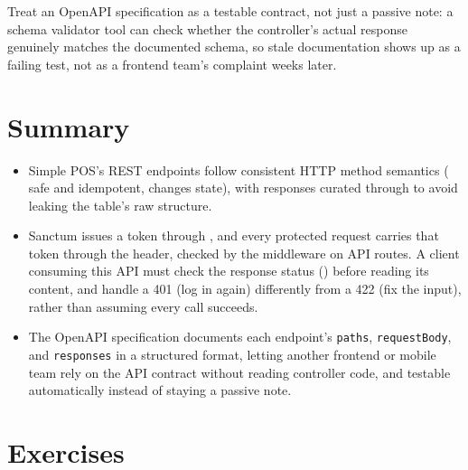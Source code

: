 \begin{tipbox}
Treat an OpenAPI specification as a testable contract, not just a
passive note: a schema validator tool can check whether the
controller's actual response genuinely matches the documented schema,
so stale documentation shows up as a failing test, not as a frontend
team's complaint weeks later.
\end{tipbox}


\section{Summary}
\label{sec:membangun-rest-api-rangkuman}

\begin{itemize}
  \item Simple POS's REST endpoints follow consistent HTTP method
    semantics ( safe and idempotent,  changes
    state), with responses curated through  to
    avoid leaking the table's raw structure.
  \item Sanctum issues a token through , and
    every protected request carries that token through the
     header, checked by the
     middleware on API routes. A client consuming
    this API must check the response status ()
    before reading its content, and handle a 401 (log in again)
    differently from a 422 (fix the input), rather than assuming every
    call succeeds.
  \item The OpenAPI specification documents each endpoint's
    \texttt{paths}, \texttt{requestBody}, and \texttt{responses} in a
    structured format, letting another frontend or mobile team rely on
    the API contract without reading controller code, and testable
    automatically instead of staying a passive note.
\end{itemize}

\section{Exercises}

